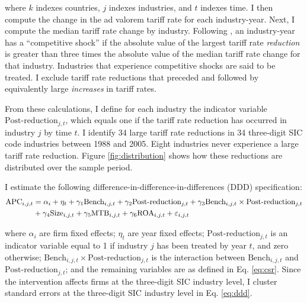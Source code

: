 \documentclass[notitlepage, 12pt]{article}
\begin{document}
\noindent where $k$ indexes countries, $j$ indexes industries, and $t$ indexes time. I then compute the change in the ad valorem tariff rate for each industry-year. Next, I compute the median tariff rate change by industry. Following \citet{valta:2012}, an industry-year has a ``competitive shock'' if the absolute value of the largest tariff rate \textit{reduction} is greater than three times the absolute value of the median tariff rate change for that industry. Industries that experience competitive shocks are said to be treated. I exclude tariff rate reductions that preceded and followed by equivalently large \textit{increases} in tariff rates.
\newline

\noindent From these calculations, I define for each industry the indicator variable $\text{Post-reduction}_{j,t}$, which equals one if the tariff rate reduction has occurred in industry $j$ by time $t$. I identify 34 large tariff rate reductions in 34 three-digit SIC code industries between 1988 and 2005. Eight industries never experience a large tariff rate reduction. Figure \ref{fig:distribution} shows how these reductions are distributed over the sample period.
\newline

\noindent I estimate the following difference-in-difference-in-differences (DDD) specification:
\begin{align}\label{eq:ddd}
\text{APC}_{i,j,t} &= \alpha_{i} + \eta_{t} + \gamma_{1}\text{Bench}_{i,j,t} + \gamma_{2}\text{Post-reduction}_{j,t} + \gamma_{3}\text{Bench}_{i,j,t}\times\text{Post-reduction}_{j,t} \notag \\
&+ \gamma_{4}\text{Size}_{i,j,t} + \gamma_{5}\text{MTB}_{i,j,t} + \gamma_{6}\text{ROA}_{i,j,t} + \varepsilon_{i,j,t}
\end{align}

\noindent where $\alpha_{i}$ are firm fixed effects; $\eta_{t}$ are year fixed effects; $\text{Post-reduction}_{j,t}$ is an indicator variable equal to 1 if industry $j$ has been treated by year $t$, and zero otherwise; $\text{Bench}_{i,j,t} \times \text{Post-reduction}_{j,t}$ is the interaction between $\text{Bench}_{i,j,t}$ and $\text{Post-reduction}_{j,t}$; and the remaining variables are as defined in Eq. \eqref{eq:csr}. \noindent Since the intervention affects firms at the three-digit SIC industry level, I cluster standard errors at the three-digit SIC industry level \citep*{bdm:2004} in Eq. \eqref{eq:ddd}.
\newline
\end{document}
